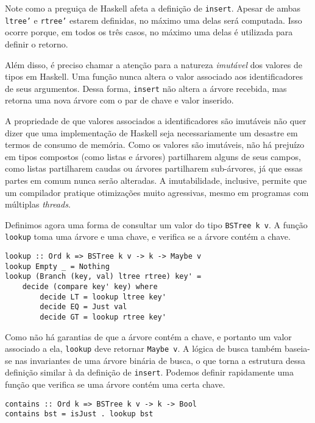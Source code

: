 \documentclass[a4paper]{article}
\begin{document}
Note como a preguiça de Haskell afeta a definição de \texttt{insert}.
Apesar de ambas \texttt{ltree'} e \texttt{rtree'} estarem definidas, no máximo uma delas será computada.
Isso ocorre porque, em todos os três casos, no máximo uma delas é utilizada para definir o retorno.

Além disso, é preciso chamar a atenção para a natureza \emph{imutável} dos valores de tipos em Haskell.
Uma função nunca altera o valor associado aos identificadores de seus argumentos.
Dessa forma, \texttt{insert} não altera a árvore recebida, mas retorna uma nova árvore com o par de chave e valor inserido.

A propriedade de que valores associados a identificadores são imutáveis não quer dizer que uma implementação de Haskell seja necessariamente um desastre em termos de consumo de memória.
Como os valores são imutáveis, não há prejuízo em tipos compostos (como listas e árvores) partilharem alguns de seus campos, como listas partilharem caudas ou árvores partilharem sub-árvores, já que essas partes em comum nunca serão alteradas.
A imutabilidade, inclusive, permite que um compilador pratique otimizações muito agressivas, mesmo em programas com múltiplas \emph{threads}.

Definimos agora uma forma de consultar um valor do tipo \texttt{BSTree k v}.
A função \texttt{lookup} toma uma árvore e uma chave, e verifica se a árvore contém a chave.

\pagebreak

\begin{verbatim}
lookup :: Ord k => BSTree k v -> k -> Maybe v
lookup Empty _ = Nothing
lookup (Branch (key, val) ltree rtree) key' =
	decide (compare key' key) where
		decide LT = lookup ltree key'
		decide EQ = Just val
		decide GT = lookup rtree key'
\end{verbatim}

Como não há garantias de que a árvore contém a chave, e portanto um valor associado a ela, \texttt{lookup} deve retornar \texttt{Maybe v}.
A lógica de busca também baseia-se nas invariantes de uma árvore binária de busca, o que torna a estrutura dessa definição similar à da definição de \texttt{insert}.
Podemos definir rapidamente uma função que verifica se uma árvore contém uma certa chave.

\begin{verbatim}
contains :: Ord k => BSTree k v -> k -> Bool
contains bst = isJust . lookup bst
\end{verbatim}
\end{document}
